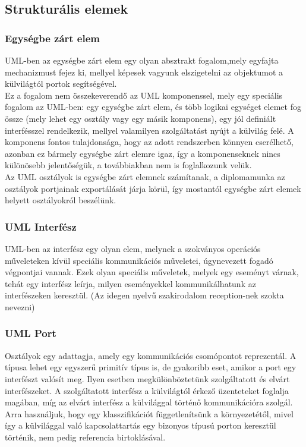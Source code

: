\documentclass[a4paper,12pt]{report}
\begin{document}
\subsection{Strukturális elemek}
\subsubsection{Egységbe zárt elem} \label{class}
UML-ben az egységbe zárt elem egy olyan absztrakt fogalom,mely egyfajta mechanizmust fejez ki, mellyel képesek vagyunk elszigetelni az objektumot a külvilágtól portok segítségével.\\ Ez a fogalom nem összekeverendő az UML komponenssel, mely egy speciális fogalom az UML-ben: egy egységbe zárt elem, és több logikai egységet elemet fog össze (mely lehet egy osztály vagy egy másik komponens), egy jól definiált interfésszel rendelkezik, mellyel valamilyen szolgáltatást nyújt a külvilág felé. A komponens fontos tulajdonsága, hogy az adott rendszerben könnyen cserélhető, azonban ez bármely egységbe zárt elemre igaz, így a komponenseknek nincs különösebb jelentőségük, a továbbiakban nem is foglalkozunk velük. \\
Az UML osztályok is egységbe zárt elemnek számítanak, a diplomamunka az osztályok portjainak exportálását járja körül, így mostantól egységbe zárt elemek helyett osztályokról beszélünk.
\subsubsection{UML Interfész}
UML-ben az interfész egy olyan elem, melynek a szokványos operációs műveleteken kívül speciális kommunikációs műveletei, úgynevezett fogadó végpontjai  vannak. Ezek olyan speciális műveletek, melyek egy eseményt várnak, tehát egy interfész leírja, milyen eseményekkel kommunikálhatunk az interfészeken keresztül. (Az idegen nyelvű szakirodalom reception-nek szokta nevezni)
\subsubsection{UML Port}
Osztályok egy adattagja, amely egy kommunikációs csomópontot reprezentál. A típusa lehet egy egyszerű primitív típus is, de gyakoribb eset, amikor a port egy interfészt valósít meg. Ilyen esetben megkülönböztetünk szolgáltatott és elvárt interfészeket. A szolgáltatott interfész a külvilágtól érkező üzenteteket foglalja magában, míg az elvárt interfész a külvilággal történő kommunikációra szolgál. Arra használjuk, hogy egy klasszifikációt függetlenítsünk a környezetétől, mivel így a külvilággal való kapcsolattartás egy bizonyos típusú porton keresztül történik, nem pedig referencia birtoklásával.
\end{document}
